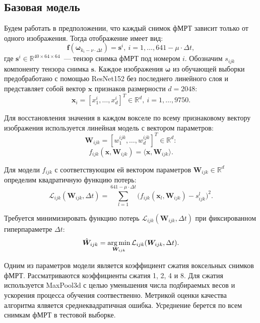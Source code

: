 \documentclass[12pt,twoside]{article}
\begin{document}
\subsection{Базовая модель}
Будем работать в предположении, что каждый снимок фМРТ зависит только от одного изображения.
Тогда отображение имеет вид:
\begin{equation}
	\label{basic_model}
	\bm{f}(\bm{\omega}_{k_i - \nu \cdot \Delta t}) = \bm{s}^i, \ i = 1, \ldots, 641-\mu \cdot \Delta t,
\end{equation}
где $\bm{s}^i \in \mathbb{R}^{40 \times 64 \times 64}$~--- тензор снимка фМРТ под номером $i$.
Обозначим $s_{ijk}$ компоненту тензора снимка $\bm{s}$.
Каждое изображения $\bm{\omega}$ из обучающей выборки предобработано с помощью ResNet152 без последнего линейного слоя и представляет собой вектор $\bm{x}$ признаков размерности $d=2048$:
\[ \bm{x}_i = [x^i_1, \ldots, x^i_{d}]^{T} \in \mathbb{R}^{d}, \ i = 1, \ldots, 9750. \]
	
Для восстановления значения в каждом вокселе по всему признаковому вектору изображения используется линейная модель с вектором параметров:
\[ \bm{W}_{ijk} = [w^{ijk}_1, \ldots, w^{ijk}_{d}]^{T} \in \mathbb{R}^{d}: \]
\begin{equation}
	\label{f_ijk}
	f_{ijk}(\bm{x}, \bm{W}_{ijk}) = \langle \bm{x}, \bm{W}_{ijk} \rangle.
\end{equation}

Для модели $f_{ijk}$ с соответствующим ей вектором параметров $\bm{W}_{ijk} \in \mathbb{R}^{d}$
определим квадратичную функцию потерь:
\begin{equation}
	\label{Loss}
	\mathcal{L}_{ijk}(\bm{W}_{ijk}, \Delta t) = \sum\limits_{l = 1}^{641 - \mu \cdot \Delta t} \big(f_{ijk}(\bm{x}_l, \bm{W}_{ijk}) - s^{l}_{ijk}\big)^2.
\end{equation}

Требуется минимизировать функцию потерь $\mathcal{L}_{ijk}(\bm{W}_{ijk}, \Delta t)$ при фиксированном гиперпараметре $\Delta t$:
\begin{equation}
	\label{basic_Problem}
	\hat{\bm{W}}_{ijk} = \argmin_{\bm{W}_{ijk}} \mathcal{L}_{ijk}(\bm{W}_{ijk}, \Delta t).
\end{equation} 

Одним из параметров модели является коэффициент сжатия воксельных снимков фМРТ. 
Рассматриваются коэффициенты сжатия 1, 2, 4 и 8.
Для сжатия используется MaxPool3d с целью уменьшения числа подбираемых весов и ускорения процесса обучения соотвественно.
Метрикой оценки качества алгоритма ялвяется среднеквадратичная ошибка.
Усреднение берется по всем снимкам фМРТ в тестовой выборке.
\end{document}
